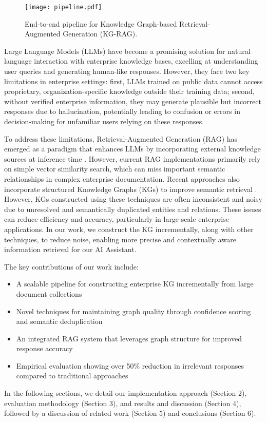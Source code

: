 \begin{figure*}[h]
    
    \texttt{[image: pipeline.pdf]} 
     \vspace{-1em}
    \caption{End-to-end pipeline for Knowledge Graph-based Retrieval-Augmented Generation (KG-RAG).}
     \vspace{-1em}
    \label{fig:kg_pipeline}
\end{figure*}

Large Language Models (LLMs) have become a promising solution for natural language interaction with enterprise knowledge bases, excelling at understanding user queries and generating human-like responses\cite{caldarini2022literature}. However, they face two key limitations in enterprise settings: first, LLMs trained on public data cannot access proprietary, organization-specific knowledge outside their training data; second,  without verified enterprise information, they may generate plausible but incorrect responses due to hallucination, potentially leading to confusion or errors in decision-making for unfamiliar users relying on these responses.


To address these limitations, Retrieval-Augmented Generation (RAG) has emerged as a paradigm that enhances LLMs by incorporating external knowledge sources at inference time \cite{gao2023retrieval}. However, current RAG implementations primarily rely on simple vector similarity search, which can miss important semantic relationships in complex enterprise documentation. Recent approaches also incorporate structured Knowledge Graphs (KGs) to improve semantic retrieval \cite{edge2024local}. However, KGs constructed using these techniques are often inconsistent and noisy due to unresolved and semantically duplicated entities and relations\cite{carta2023iterative}. These issues can reduce efficiency and accuracy, particularly in large-scale enterprise applications. In our work, we construct the KG incrementally, along with other techniques, to reduce noise, enabling more precise and contextually aware information retrieval for our AI Assistant.

The key contributions of our work include:
\begin{itemize}[noitemsep,topsep=0pt]
 
    \item A scalable pipeline for constructing enterprise KG incrementally from large document collections
    \item Novel techniques for maintaining graph quality through confidence scoring and semantic deduplication
    \item An integrated RAG system that leverages graph structure for improved response accuracy
    \item Empirical evaluation showing over 50\% reduction in irrelevant responses compared to traditional approaches
\end{itemize}


In the following sections, we detail our implementation approach (Section 2), evaluation methodology (Section 3), and results and discussion (Section 4), followed by a discussion of related work (Section 5) and conclusions (Section 6).
